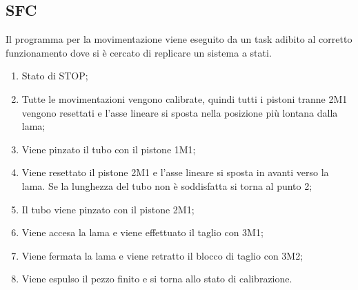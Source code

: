 \documentclass{report}
\begin{document}
\subsection{SFC}
Il programma per la movimentazione viene eseguito da un task adibito al corretto funzionamento dove si è cercato di replicare un sistema a stati.
\begin{enumerate}
\item Stato di STOP;
\item Tutte le movimentazioni vengono calibrate, quindi tutti i pistoni tranne 2M1 vengono resettati e l'asse lineare si sposta nella posizione più lontana dalla lama;
\item Viene pinzato il tubo con il pistone 1M1;
\item Viene resettato il pistone 2M1 e l'asse lineare si sposta in avanti verso la lama. Se la lunghezza del tubo non è soddisfatta si torna al punto 2;
\item Il tubo viene pinzato con il pistone 2M1;
\item Viene accesa la lama e viene effettuato il taglio con 3M1;
\item Viene fermata la lama e viene retratto il blocco di taglio con 3M2;
\item Viene espulso il pezzo finito e si torna allo stato di calibrazione.
\end{enumerate}
\end{document}
